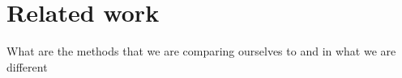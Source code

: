 \section{Related work}
What are the methods that we are comparing ourselves to and in what we are different
